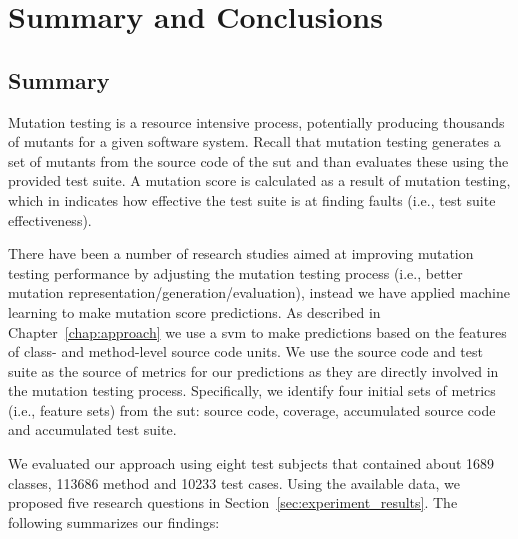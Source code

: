 \chapter{Summary and Conclusions}
\label{chap:conclusions}


\section{Summary}
\label{sec:conclusions_summary}
Mutation testing is a resource intensive process, potentially producing thousands of mutants for a given software system. Recall that mutation testing generates a set of mutants from the source code of the \gls{sut} and than evaluates these using the provided test suite. A mutation score is calculated as a result of mutation testing, which in indicates how effective the test suite is at finding faults (i.e., test suite effectiveness).

There have been a number of research studies aimed at improving mutation testing performance by adjusting the mutation testing process (i.e., better mutation representation/generation/evaluation), instead we have applied machine learning to make mutation score predictions. As described in Chapter~\ref{chap:approach} we use a \gls{svm} to make predictions based on the features of class- and method-level source code units. We use the source code and test suite as the source of metrics for our predictions as they are directly involved in the mutation testing process. Specifically, we identify four initial sets of metrics (i.e., feature sets) from the \gls{sut}: source code, coverage, accumulated source code and accumulated test suite.

We evaluated our approach using eight test subjects that contained about 1689 classes, 113686 method and 10233 test cases. Using the available data, we proposed five research questions in Section~\ref{sec:experiment_results}. The following summarizes our findings:

